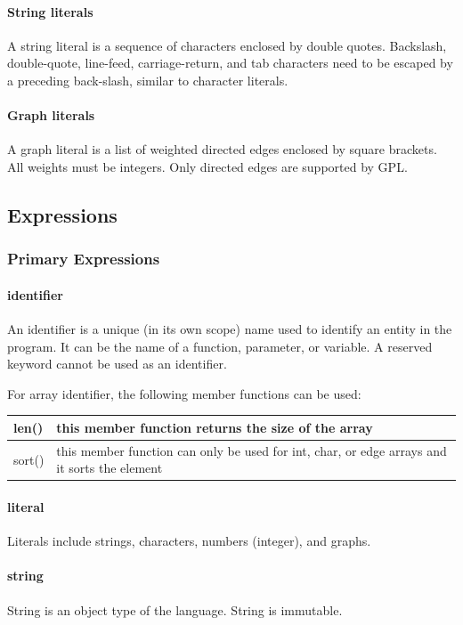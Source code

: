 \documentclass[a4paper,12pt]{article}
\begin{document}
\paragraph{String literals}
A string literal is a sequence of characters enclosed by double quotes. Backslash, double-quote, line-feed, carriage-return, and tab characters need to be escaped by a preceding back-slash, similar to character literals.

\paragraph{Graph literals}
A graph literal is a list of weighted directed edges enclosed by square brackets. All weights must be integers. Only directed edges are supported by GPL.

\subsection{Expressions}
\subsubsection{Primary Expressions}
\paragraph{identifier}
An identifier is a unique (in its own scope) name used to identify an entity in the program. It can be the name of a function, parameter, or variable.  A reserved keyword cannot be used as an identifier.

For array identifier, the following member functions can be used:
\begin{center}
\begin{tabular}{| l | p{10cm} |}
\hline
	len()		& this member function returns the size of the array \\ \hline
	sort()  & this member function can only be used for int, char, or edge arrays and it sorts the element \\ \hline
\end{tabular}
\end{center}


\paragraph{literal}
Literals include strings, characters, numbers (integer), and graphs.

\paragraph{string}
String is an object type of the language. String is immutable.
\end{document}
